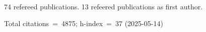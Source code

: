 74 refereed publications. 13 refeered publications as first author.

Total citations~=~4875; h-index~=~37 (2025-05-14)